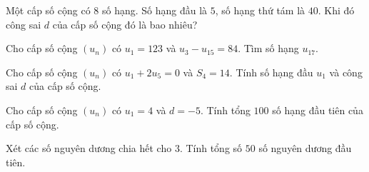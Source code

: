 \begin{vd}%
Một cấp số cộng có $8$ số hạng. Số hạng đầu là $5$, số hạng thứ tám là $40$. Khi đó công sai $d$ của cấp số cộng đó là bao nhiêu?
\end{vd}

\begin{vd}%
Cho cấp số cộng $(u_n)$ có $u_1=123$ và $u_3-u_{15}=84$. Tìm số hạng $u_{17}$.
\end{vd}

\begin{vd}%
Cho cấp số cộng $(u_n)$ có $u_1+2u_5=0$ và $S_4=14$. Tính số hạng đầu $u_1$ và công sai $d$ của cấp số cộng.
\end{vd}

\begin{vd}%
Cho cấp số cộng $(u_n)$ có $u_1=4$ và $d=-5$. Tính tổng $100$ số hạng đầu tiên của cấp số cộng.
\end{vd}

\begin{vd}%
Xét các số nguyên dương chia hết cho $3$. Tính tổng số $50$ số nguyên dương đầu tiên. 
\end{vd}

